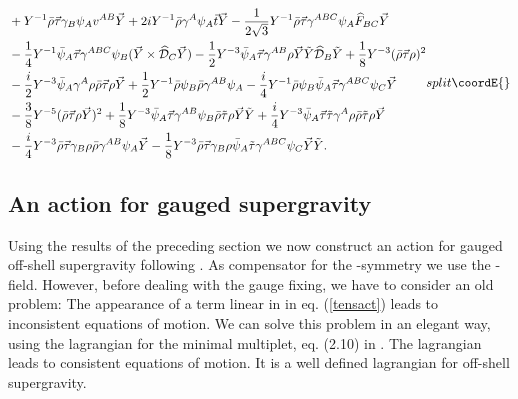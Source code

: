 \documentclass[a4paper,12pt, twoside]{article}
\numberwithin{equation}{section}
\begin{document}
\begin{equation}
{\begin{split}
& + Y^{-1}\bar{\rho}\vec{\tau}\gamma_B\psi_A v^{AB}\vec{Y} 
+2iY^{-1}\bar{\rho}\gamma^A\psi_A\vec{t}\vec{Y}- 
\frac{1}{2\sqrt{3}}Y^{-1}\bar{\rho}\vec{\tau}\gamma^{ABC}\psi_A\widehat{F}_{BC}\vec{Y}\\
&  - 
\frac{1}{4}Y^{-1}\bar{\psi}_A\vec{\tau}\gamma^{ABC}\psi_B(\vec{Y}\times\widehat{\cal D}_C\vec{Y}) - 
\frac{1}{2}Y^{-3}\bar{\psi}_A\vec{\tau}\gamma^{AB}\rho\vec{Y}\tilde{Y}\widehat{\cal 
D}_B\tilde{Y}+\frac{1}{8}Y^{-3}(\bar{\rho}\vec{\tau}\rho)^2\\
& 
-\frac{i}{2}Y^{-3}\bar{\psi}_A\gamma^A\rho\bar{\rho}\vec{\tau}\rho\vec{Y}+\frac{1}{2}Y^{-1}\bar{\rho}\psi_B\bar{\rho}\gamma^{AB}\psi_A-\frac{i}{4}Y^{-1}\bar{\rho}\psi_B\bar{\psi}_A\vec{\tau}\gamma^{ABC}\psi_C\vec{Y}\\
& -\frac{3}{8}Y^{-5}(\bar{\rho}\vec{\tau}\rho\vec{Y})^2 + 
\frac{1}{8}Y^{-3}\bar{\psi}_A\vec{\tau}\gamma^{AB}\psi_B\bar{\rho}\tilde{\tau}\rho\vec{Y}\tilde{Y} 
+ 
\frac{i}{4}Y^{-3}\bar{\psi}_A\vec{\tau}\tilde{\tau}\gamma^A\rho\bar{\rho}\tilde{\tau}\rho\vec{Y}\\
&  
-\frac{i}{4}Y^{-3}\bar{\rho}\vec{\tau}\gamma_B\rho\bar{\rho}\gamma^{AB}\psi_A\vec{Y} - 
\frac{1}{8}Y^{-3}\bar{\rho}\vec{\tau}\gamma_B\rho\bar{\psi}_A\tilde{\tau}\gamma^{ABC}\psi_C\vec{Y}\tilde{Y}.\end{split}
}{split}\coordE{}\end{equation}
\subsection{An action for gauged supergravity} \label{sugact}
Using the results of the preceding section we now construct an action 
for gauged off-shell supergravity following \cite{deWit:1983na}. As 
compensator for the \coordHE{}  \coordHE{}-symmetry we use the 
\coordHE{}-field. However, before dealing with the gauge fixing, we have to 
consider an old problem: The appearance of a term linear in \coordHE{} in eq. 
(\ref{tensact}) leads to inconsistent equations of motion. We can solve 
this problem in an elegant way, using the lagrangian \coordHE{} for 
the minimal multiplet, eq. (2.10) in \cite{Zucker:2000ej}. The 
lagrangian \coordHE{} leads to consistent 
equations of motion. It is a well defined lagrangian for off-shell 
supergravity.
\end{document}
